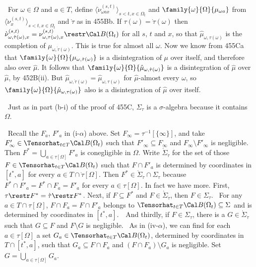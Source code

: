{\qquad\grheadb\ For $\omega\in\Omega$ and $a\in T$, define
$\langle\grave\nu^{(s,t)}_{\omega ax}
\rangle_{s<t,x\in\Omega_t}$ and
$\family{\omega}{\Omega}{\mu_{\omega a}}$
from $\langle\grave\nu^{(s,t)}_x\rangle_{s<t,x\in\Omega_t}$ and
$\grave\tau$ as in 455Bb.   If $\tau(\omega)=\grave\tau(\omega)$ then
$\grave\nu^{(s,t)}_{\omega,\grave\tau(\omega),x}
=\nu^{(s,t)}_{\omega,\tau(\omega),x}\restr\Cal B(\Omega_t)$
for all $s$, $t$ and $x$, so that
$\hat\mu_{\omega,\tau(\omega)}$ is the completion of
$\mu_{\omega,\grave\tau(\omega)}$.
This is true for almost all $\omega$.   Now we know from 455Ca that
$\family{\omega}{\Omega}{\mu_{\omega,\grave\tau(\omega)}}$
is a disintegration of $\mu$ over itself,
and therefore also over $\hat\mu$.   It follows that
$\family{\omega}{\Omega}{\hat\mu_{\omega,\grave\tau(\omega)}}$ is a
disintegration of $\hat\mu$ over $\hat\mu$, by 452B(ii).   But
$\hat\mu_{\omega,\grave\tau(\omega)}=\hat\mu_{\omega,\tau(\omega)}$ for
$\hat\mu$-almost every
$\omega$, so $\family{\omega}{\Omega}{\hat\mu_{\omega,\tau(\omega)}}$
also is a disintegration of $\hat\mu$ over itself.

\medskip

\grheada\ Just as in part (b-i) of the proof of 455C,
$\Sigma_{\tau}$ is a $\sigma$-algebra because it contains $\Omega$.

\medskip

\qquad\grheadb\ Recall the $F_a$, $F'_a$ in (i-$\alpha$) above.
Set $F_{\infty}=\tau^{-1}[\{\infty\}]$, and take
$F'_{\infty}\in\Tensorhat_{t\in T}\Cal B(\Omega_t)$ such that
$F'_{\infty}\subseteq F_{\infty}$ and $F_{\infty}\setminus F'_{\infty}$ is
negligible.   Then $F^*=\bigcup_{a\in\tau[\Omega]}F'_a$ is conegligible in
$\Omega$.   Write $\grave\Sigma_{\grave\tau}$ for the
set of those $F\in\Tensorhat_{t\in T}\Cal B(\Omega_t)$ such that
$F\cap F'_a$ is determined by coordinates in $[t^*,a]$ for every
$a\in T\cap\grave\tau[\Omega]$.   Then
$F^*\in\grave\Sigma_{\grave\tau}\cap\Sigma_{\tau}$ because
$F^*\cap F'_a=F^*\cap F_a=F'_a$ for every $a\in\tau[\Omega]$.
In fact we have more.   First, $\tau\restr F^*=\grave\tau\restr F^*$.
Next, if $F\subseteq F^*$ and $F\in\grave\Sigma_{\grave\tau}$, then
$F\in\Sigma_{\tau}$.   \Prf\ For any $a\in T\cap\tau[\Omega]$,
$F\cap F_a=F\cap F'_a$ belongs to
$\Tensorhat_{t\in T}\Cal B(\Omega_t)\subseteq\Sigma$
and is determined by coordinates in $[t^*,a]$.\ \QeD\  And thirdly, if
$F\in\Sigma_{\tau}$, there is a
$G\in\grave\Sigma_{\grave\tau}$ such that $G\subseteq F$ and
$F\setminus G$ is negligible.   \Prf\ As in (iv-$\alpha$), we can find for
each $a\in\tau[\Omega]$ a set $G_a\in\Tensorhat_{t\in T}\Cal B(\Omega_t)$,
determined by coordinates in $T\cap[t^*,a]$, such that
$G_a\subseteq F\cap F_a$ and
$(F\cap F_a)\setminus G_a$ is negligible.   Set
$G=\bigcup_{a\in\tau[\Omega]}G_a$.\ \Qed

}
